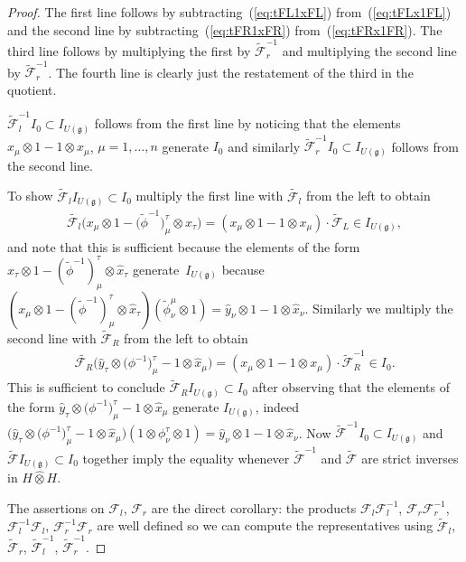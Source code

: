 \documentclass[10pt,a4paper]{amsart}
\def\gg{\mathfrak{g}}
\def\hx{\hat{x}}
\def\hy{\hat{y}}
\numberwithin{equation}{section}
\begin{document}
\begin{proof} The first line follows by subtracting~(\ref{eq:tFL1xFL}) from~(\ref{eq:tFLx1FL}) and the second line by subtrac\-ting~(\ref{eq:tFR1xFR}) from~(\ref{eq:tFRx1FR}). The third line follows by multiplying the first by $\tilde{\mathcal{F}}_r^{-1}$ and multiplying the second line by $\tilde{\mathcal{F}}_r^{-1}$. The fourth line is clearly just the restatement of the third in the quotient.

$\tilde{\mathcal{F}}_l^{-1} I_0\subset I_{U(\gg)}$ follows from the first line by noticing that the elements $x_\mu\otimes 1-1\otimes x_\mu$, $\mu = 1,\dots,n$ generate $I_0$ and similarly $\tilde{\mathcal{F}}_r^{-1} I_0\subset I_{U(\gg)}$ follows from the second line.

To show $\tilde{\mathcal{F}}_l I_{U(\gg)} \subset I_0$ multiply the first line with $\tilde{\mathcal{F}_l}$ from the left to obtain
\begin{gather*}
\tilde{\mathcal{F}_l}\big(x_\mu\otimes 1 - \big(\tilde\phi^{-1}\big)^\tau_\mu\otimes\hat{x}_\tau\big) = (x_\mu\otimes 1 - 1\otimes x_\mu)\cdot\tilde{\mathcal{F}}_L\in I_{U(\gg)},
\end{gather*}
and note that this is sufficient because the elements of the form $x_\tau\otimes 1 - (\tilde\phi^{-1})^\tau_\mu\otimes\hat{x}_\tau$ genera\-te~$I_{U(\gg)}$ because $(x_\mu\otimes 1 - (\tilde\phi^{-1})^\tau_\mu\otimes\hat{x}_\tau)(\tilde\phi^\mu_\nu\otimes 1) = \hat{y}_\nu\otimes 1 - 1\otimes\hat{x}_\nu$. Similarly we multiply the second line with $\tilde{\mathcal{F}}_R$ from the left to obtain
\begin{gather*}
\tilde{\mathcal{F}_R}\big(\hy_\tau\otimes\big(\phi^{-1}\big)^\tau_\mu- 1\otimes\hx_\mu\big) = (x_\mu\otimes 1 - 1\otimes x_\mu)\cdot\tilde{\mathcal{F}}_R^{-1}\in I_0.
\end{gather*}
This is sufficient to conclude $\tilde{\mathcal{F}}_R I_{U(\gg)}\subset I_0$ after observing that the elements of the form $\hy_\tau\otimes\big(\phi^{-1}\big)^\tau_\mu- 1\otimes\hx_\mu$ generate $I_{U(\gg)}$, indeed $\big(\hy_\tau\otimes\big(\phi^{-1}\big)^\tau_\mu- 1\otimes\hx_\mu\big) (1\otimes\phi^\tau_\nu\otimes 1) = \hy_\nu\otimes 1-1\otimes\hx_\nu$. Now $\tilde{\mathcal{F}}^{-1} I_0\subset I_{U(\gg)}$ and $\tilde{\mathcal{F}}I_{U(\gg)}\subset I_0$ together imply the equality whenever $\tilde{\mathcal{F}}^{-1}$ and $\tilde{\mathcal{F}}$ are strict inverses in $H\hat\otimes H$.

The assertions on $\mathcal{F}_l$, $\mathcal{F}_r$ are the direct corollary: the products $\mathcal{F}_l\mathcal{F}_l^{-1}$, $\mathcal{F}_r\mathcal{F}_r^{-1}$, $\mathcal{F}^{-1}_l\mathcal{F}_l$, $\mathcal{F}^{-1}_r\mathcal{F}_r$ are well defined so we can compute the representatives using $\tilde{\mathcal{F}}_l$, $\tilde{\mathcal{F}}_r$, $\tilde{\mathcal{F}}^{-1}_l$, $\tilde{\mathcal{F}}_r^{-1}$.
\end{proof}
\end{document}
